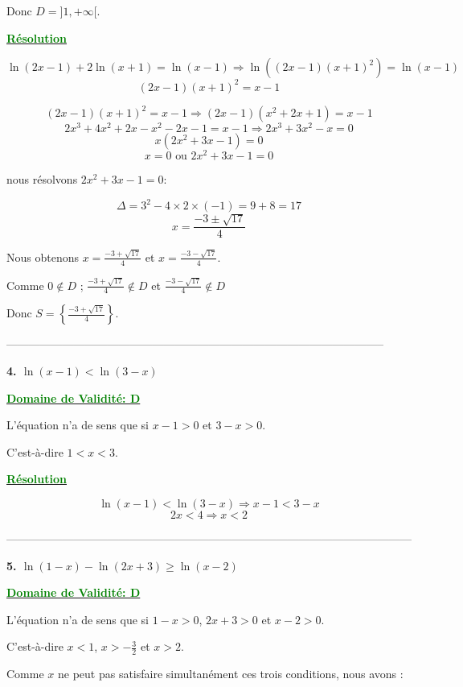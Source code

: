 \documentclass[12pt]{article}
\begin{document}
Donc \(D = ]1, +\infty[\).

\textbf{\underline{\textcolor{green}{Résolution}}}

\[
\ln(2x-1)+2\ln(x+1)=\ln(x-1)\Longrightarrow \ln((2x-1)(x+1)^2)=\ln(x-1)
\]
\[
(2x-1)(x+1)^2=x-1
\]

\[
(2x-1)(x+1)^2=x-1 \Longrightarrow (2x-1)(x^2 + 2x + 1)=x-1
\]
\[
2x^3 + 4x^2 + 2x - x^2 - 2x - 1 = x - 1 \Longrightarrow 2x^3 + 3x^2 - x = 0
\]
\[
x(2x^2 + 3x - 1) = 0
\]
\[
x=0 \text{ ou } 2x^2 + 3x - 1 = 0
\]

nous résolvons \(2x^2 + 3x - 1 = 0\):

\[
\Delta = 3^2 - 4 \times 2 \times (-1) = 9 + 8 = 17
\]
\[
x = \frac{-3 \pm \sqrt{17}}{4}
\]

Nous obtenons \(x = \frac{-3 + \sqrt{17}}{4}\) et \(x = \frac{-3 - \sqrt{17}}{4}\).

Comme \(0 \notin D\) ; \(\frac{-3 + \sqrt{17}}{4} \notin D\) et \(\frac{-3 - \sqrt{17}}{4} \notin D\)  

Donc \(S = \left\{\frac{-3 + \sqrt{17}}{4}\right\}\).

\textcolor{green}{}

-----------------------------------------------------------------------------------------------------

\textbf{4. \(\ln(x-1)<\ln(3-x)\)}

\textbf{\underline{\textcolor{green}{Domaine de Validité: D}}}

L'équation n'a de sens que si \(x-1>0\) et \(3-x>0\).

C'est-à-dire \(1<x<3\).

\textbf{\underline{\textcolor{green}{Résolution}}}

\[
\ln(x-1)<\ln(3-x)\Longrightarrow x-1<3-x
\]
\[
2x<4\Longrightarrow x<2
\]

\textcolor{green}{\boxed{S=]1,2[}}

------------------------------------------------------------------------------------------------------------

\textbf{5. \(\ln(1-x)-\ln(2x+3)\geq\ln(x-2)\)}

\textbf{\underline{\textcolor{green}{Domaine de Validité: D}}}

L'équation n'a de sens que si \(1-x>0\), \(2x+3>0\) et \(x-2>0\).

C'est-à-dire \(x<1\), \(x>-\frac{3}{2}\) et \(x>2\).

Comme \(x\) ne peut pas satisfaire simultanément ces trois conditions, nous avons :
\end{document}

